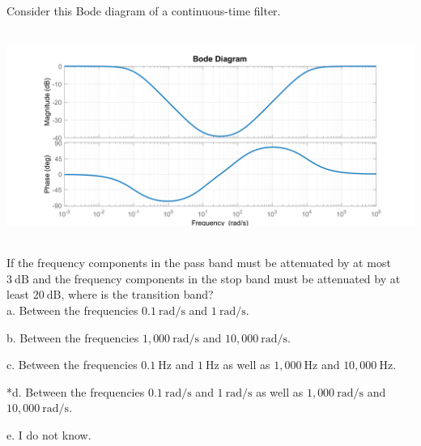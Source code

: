 
Consider this Bode diagram of a continuous-time filter.

\includegraphics[width=6.07864in,height=2.69855in]{../../Images/BodeDiagramQ3.png}

If the frequency components in the pass band must be attenuated by at most \(3\ \text{dB}\) and the frequency components in the stop band must be attenuated by at least \(20\ \text{dB}\), where is the transition band?\\

a. Between the frequencies \(0.1\ \text{rad/s}\) and \(1\ \text{rad/s}\).

b. Between the frequencies \(1,000\ \text{rad/s}\) and \(10,000\ \text{rad/s}\).

c. Between the frequencies \(0.1\ \text{Hz}\) and \(1\ \text{Hz}\) as well as \(1,000\ \text{Hz}\) and \(10,000\ \text{Hz}\).

*d. Between the frequencies \(0.1\ \text{rad/s}\) and \(1\ \text{rad/s}\) as well as \(1,000\ \text{rad/s}\) and \(10,000\ \text{rad/s}\).

e. I do not know.\\

